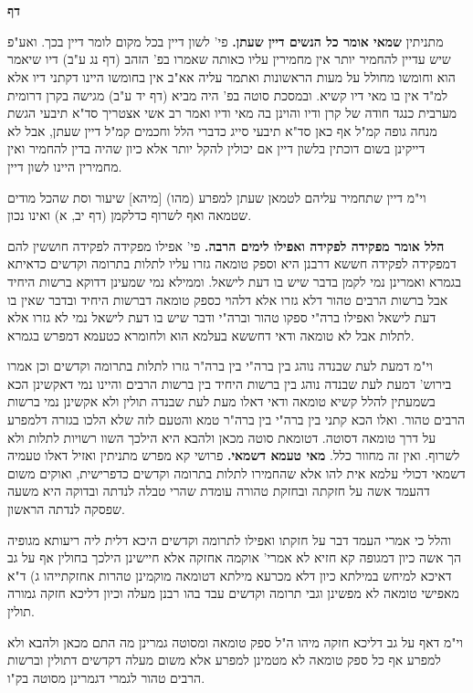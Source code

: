 \documentclass[12pt, openany]{book}
\newcommand{\sethebfont}{
\fontsize{10.5pt}{21.0pt} \selectfont
}
\newcommand{\twocol}[1]{
	{\sethebfont \begin{multicols}{2}
			#1
	\end{multicols}}	
}
\newcommand{\textblock}[1]{
{\sethebfont #1\\}	
}
\newcommand{\chapname}{}
\newcommand{\newchap}[1]{
	\addcontentsline{toc}{chapter}{#1}
	\renewcommand{\chapname}{#1}
		\begin{center}
			\textbf{%
\fontsize{16pt}{16pt}\selectfont
				#1}
		\end{center}
}
\begin{document}
\textblock{}{}
\textblock{}{}
\newchap{דף }
\twocol{מתניתין \textbf{שמאי אומר כל הנשים דיין שעתן.}  פי' לשון דיין בכל מקום לומר דיין בכך. ואע"פ שיש עדיין להחמיר יותר אין מחמירין עליו כאותה שאמרו בפ' הזהב (דף נג ע"ב) דיו שיאמר הוא וחומשו מחולל על מעות הראשונות ואתמר עליה אא"ב אין בחומשו היינו דקתני דיו אלא למ"ד אין בו מאי דיו קשיא. ובמסכת סוטה בפ' היה מביא (דף יד ע"ב) מגישה בקרן דרומית מערבית כנגד חודה של קרן ודיו והוינן בה מאי ודיו ואמר רב אשי אצטריך סד"א תיבעי הגשת מנחה גופה קמ"ל אף כאן סד"א תיבעי סייג כדברי הלל וחכמים קמ"ל דיין שעתן, אבל לא דייקינן בשום דוכתין בלשון דיין אם יכולין להקל יותר אלא כיון שהיה בדין להחמיר ואין מחמירין היינו לשון דיין.\par וי"מ דיין שתחמיר עליהם לטמאן שעתן למפרע (מהו) [מיהא] שיעור וסת שהכל מודים שטמאה ואף לשרוף כדלקמן (דף יב, א) ואינו נכון. 
\par\textbf{הלל אומר מפקידה לפקידה ואפילו לימים הרבה.}  פי' אפילו מפקידה לפקידה חוששין להם דמפקידה לפקידה חששא דרבנן היא וספק טומאה גזרו עליו לתלות בתרומה וקדשים כדאיתא בגמרא ואמרינן נמי לקמן בדבר שיש בו דעת לישאל. וממילא נמי שמעינן דדוקא ברשות היחיד אבל ברשות הרבים טהור דלא גזרו אלא דלהוי כספק טומאה דברשות היחיד ובדבר שאין בו דעת לישאל ואפילו ברה"י ספקו טהור וברה"י ודבר שיש בו דעת לישאל נמי לא גזרו אלא לתלות אבל לא טומאה ודאי דחששא בעלמא הוא ולחומרא כטעמא דמפרש בגמרא.\par וי"מ דמעת לעת שבנדה נוהג בין ברה"י בין ברה"ר גזרו לתלות בתרומה וקדשים וכן אמרו בירוש' דמעת לעת שבנדה נוהג בין ברשות היחיד בין ברשות הרבים והיינו נמי דאקשינן הכא בשמעתין להלל קשיא טומאה ודאי דאלו מעת לעת שבנדה תולין ולא אקשינן נמי ברשות הרבים טהור. ואלו הכא קתני בין ברה"י בין ברה"ר טמא והטעם לזה שלא הלכו בגזרה דלמפרע על דרך טומאה דסוטה. דטומאת סוטה מכאן ולהבא היא הילכך השוו רשויות לתלות ולא לשרוף. ואין זה מחוור כלל. 
\parגמרא \textbf{מאי טעמא דשמאי.}  פרושי קא מפרש מתניתין ואזיל דאלו טעמיה דשמאי דכולי עלמא אית להו אלא שהחמירו לתלות בתרומה וקדשים כדפרישית, ואוקים משום דהעמד אשה על חזקתה ובחזקת טהורה עומדת שהרי טבלה לנדתה ובדוקה היא משעה שפסקה לנדתה הראשון.\par  והלל כי אמרי העמד דבר על חזקתו ואפילו לתרומה וקדשים היכא דלית ליה ריעותא מגופיה הך אשה כיון דמגופה קא חזיא לא אמרי' אוקמה אחזקה אלא חיישינן הילכך בחולין אף על גב דאיכא למיחש במילתא כיון דלא מכרעא מילתא דטומאה מוקמינן טהרות אחזקתייהו ג) ד"א מאפישי טומאה לא מפשינן וגבי תרומה וקדשים עבד בהו רבנן מעלה וכיון דליכא חזקה גמורה תולין.\par וי"מ דאף על גב דליכא חזקה מיהו ה"ל ספק טומאה ומסוטה גמרינן מה התם מכאן ולהבא ולא למפרע אף כל ספק טומאה לא מטמינן למפרע אלא משום מעלה דקדשים דתולין וברשות הרבים טהור לגמרי דגמרינן מסוטה בק"ו. 
\par}
\end{document}
